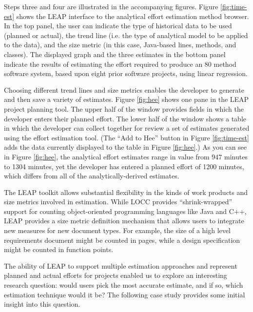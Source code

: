 Steps three and four are illustrated in the accompanying figures.  Figure
\ref{fig:time-est} shows the LEAP interface to the analytical effort estimation
method browser.  In the top panel, the user can indicate the type of
historical data to be used (planned or actual), the trend line (i.e. the
type of analytical model to be applied to the data), and the size metric
(in this case, Java-based lines, methods, and classes).  The displayed
graph and the three estimates in the bottom panel indicate the results of
estimating the effort required to produce an 80 method software system, based
upon eight prior software projects, using linear regression.

Choosing different trend lines and size metrics enables the developer
to generate and then save a variety of estimates.
Figure \ref{fig:hee} shows one pane in the LEAP project
planning tool.  The upper half of the window provides fields in which the
developer enters their planned effort. The lower half of the window shows a
table in which the developer can collect together for review a set of
estimates generated using the effort estimation tool. (The ``Add to Hee''
button in Figure \ref{fig:time-est} adds the data currently displayed to
the table in Figure \ref{fig:hee}.)  As you can see in Figure
\ref{fig:hee}, the analytical effort estimates range in value from 947
minutes to 1304 minutes, yet the developer has entered a planned effort of
1200 minutes, which differs from all of the analytically-derived
estimates. 

\begin{figure*}[t]
  {\centerline{}}
  \caption{One pane in the LEAP project plan tool.  The table in the lower
  half of the screen lists the estimates used in coming up with the plan. }
  \label{fig:hee}
\end{figure*}

The LEAP toolkit allows substantial flexibility in the kinds of work
products and size metrics involved in estimation.  While LOCC provides
``shrink-wrapped'' support for counting object-oriented programming
languages like Java and C++, LEAP provides a size metric definition
mechanism that allows users to integrate new measures for new document
types. For example, the size of a high level requirements document might be
counted in pages, while a design specification might be counted in function
points. 

The ability of LEAP to support multiple estimation approaches and represent 
planned and actual efforts for projects enabled us to explore an interesting
research question: would users pick the most accurate estimate, and if so,
which estimation technique would it be?  The following case study provides
some initial insight into this question. 


